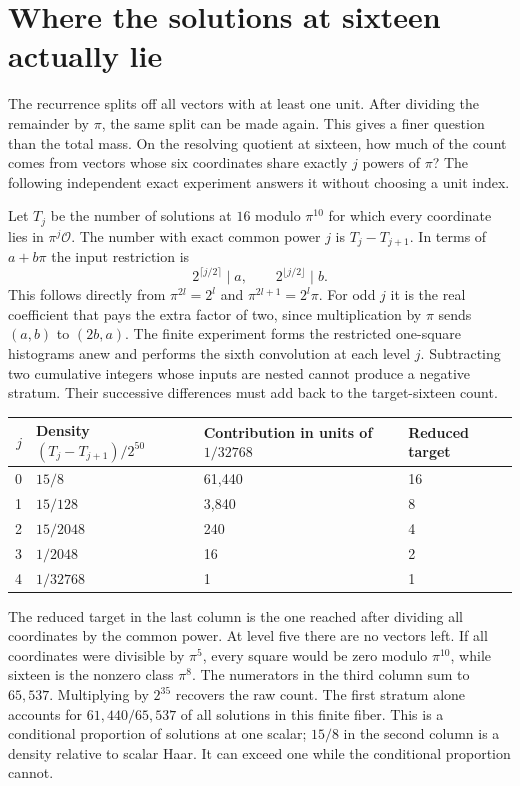 \documentclass[12pt,letterpaper]{article}
\begin{document}
\section{Where the solutions at sixteen actually lie}
The recurrence splits off all vectors with at least one unit. After dividing the remainder by $\pi$, the same split can be made again. This gives a finer question than the total mass. On the resolving quotient at sixteen, how much of the count comes from vectors whose six coordinates share exactly $j$ powers of $\pi$? The following independent exact experiment answers it without choosing a unit index.

Let $T_j$ be the number of solutions at $16$ modulo $\pi^{10}$ for which every coordinate lies in $\pi^j\mathcal O$. The number with exact common power $j$ is $T_j-T_{j+1}$. In terms of $a+b\pi$ the input restriction is
\[
  2^{\lceil j/2\rceil}\mid a,\qquad
  2^{\lfloor j/2\rfloor}\mid b .
\]
This follows directly from $\pi^{2l}=2^l$ and $\pi^{2l+1}=2^l\pi$. For odd $j$ it is the real coefficient that pays the extra factor of two, since multiplication by $\pi$ sends $(a,b)$ to $(2b,a)$. The finite experiment forms the restricted one-square histograms anew and performs the sixth convolution at each level $j$. Subtracting two cumulative integers whose inputs are nested cannot produce a negative stratum. Their successive differences must add back to the target-sixteen count.

\begin{center}\small\begin{tabular}{rlll}\toprule
$j$&Density $(T_j-T_{j+1})/2^{50}$&Contribution in units of $1/32768$&Reduced target\\\midrule
0&$15/8$&61,440&16\\
1&$15/128$&3,840&8\\
2&$15/2048$&240&4\\
3&$1/2048$&16&2\\
4&$1/32768$&1&1\\\bottomrule
\end{tabular}\end{center}
The reduced target in the last column is the one reached after dividing all coordinates by the common power. At level five there are no vectors left. If all coordinates were divisible by $\pi^5$, every square would be zero modulo $\pi^{10}$, while sixteen is the nonzero class $\pi^8$. The numerators in the third column sum to $65{,}537$. Multiplying by $2^{35}$ recovers the raw count. The first stratum alone accounts for $61{,}440/65{,}537$ of all solutions in this finite fiber. This is a conditional proportion of solutions at one scalar; $15/8$ in the second column is a density relative to scalar Haar. It can exceed one while the conditional proportion cannot.
\end{document}
